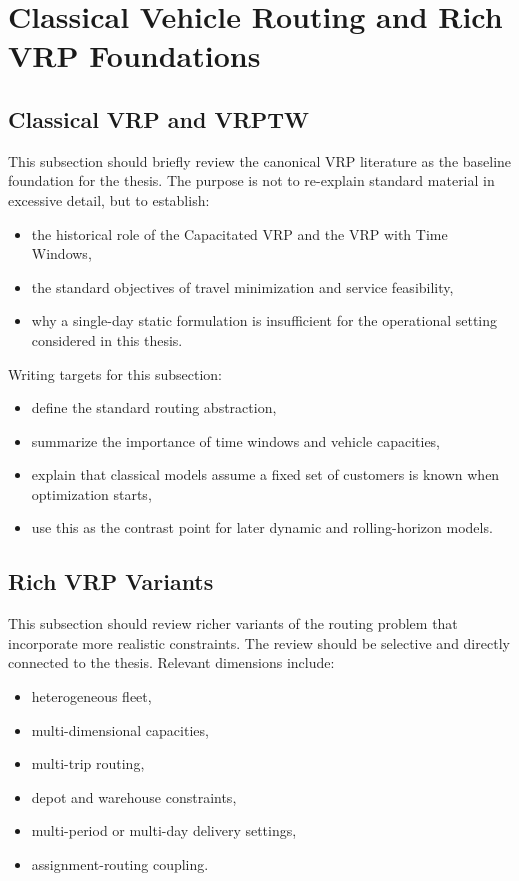 \section{Classical Vehicle Routing and Rich VRP Foundations}

\subsection{Classical VRP and VRPTW}

This subsection should briefly review the canonical VRP literature as the baseline foundation for the thesis. The purpose is not to re-explain standard material in excessive detail, but to establish:

\begin{itemize}
    \item the historical role of the Capacitated VRP and the VRP with Time Windows,
    \item the standard objectives of travel minimization and service feasibility,
    \item why a single-day static formulation is insufficient for the operational setting considered in this thesis.
\end{itemize}

Writing targets for this subsection:

\begin{itemize}
    \item define the standard routing abstraction,
    \item summarize the importance of time windows and vehicle capacities,
    \item explain that classical models assume a fixed set of customers is known when optimization starts,
    \item use this as the contrast point for later dynamic and rolling-horizon models.
\end{itemize}

\subsection{Rich VRP Variants}

This subsection should review richer variants of the routing problem that incorporate more realistic constraints. The review should be selective and directly connected to the thesis. Relevant dimensions include:

\begin{itemize}
    \item heterogeneous fleet,
    \item multi-dimensional capacities,
    \item multi-trip routing,
    \item depot and warehouse constraints,
    \item multi-period or multi-day delivery settings,
    \item assignment-routing coupling.
\end{itemize}

